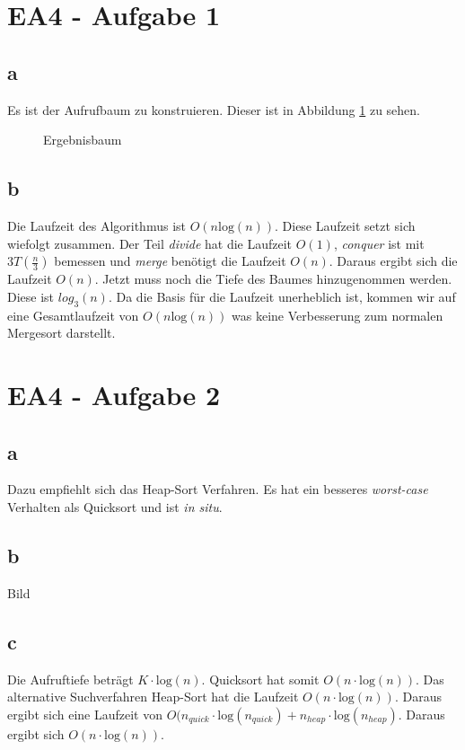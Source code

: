 \documentclass[12pt]{article}
\begin{document}
\section*{EA4 - Aufgabe 1}

\subsection*{a}
Es ist der Aufrufbaum zu konstruieren. Dieser ist in Abbildung \ref{img:abb1} zu sehen.
\begin{figure}[h]
	\centering
	\scalebox{.5}{}
	\caption{Ergebnisbaum}
	\label{img:abb1}
\end{figure}
\subsection*{b}
Die Laufzeit des Algorithmus ist $O(n \text{log}(n))$. Diese Laufzeit setzt sich wiefolgt zusammen. Der Teil
\textit{divide} hat die Laufzeit $O(1)$, \textit{conquer} ist mit $3T(\frac{n}{3})$ bemessen und \textit{merge}
benötigt die Laufzeit $O(n)$. Daraus ergibt sich die Laufzeit $O(n)$. Jetzt muss noch die Tiefe des Baumes
hinzugenommen werden. Diese ist $log_3 (n)$. Da die Basis für die Laufzeit unerheblich ist, kommen wir auf eine
Gesamtlaufzeit von $O(n\text{log}(n))$ was keine Verbesserung zum normalen Mergesort darstellt.

\section*{EA4 - Aufgabe 2}

\subsection*{a}
Dazu empfiehlt sich das Heap-Sort Verfahren. Es hat ein besseres \textit{worst-case} Verhalten als Quicksort und ist
\textit{in situ}.

\subsection*{b}
Bild

\subsection*{c}
Die Aufruftiefe beträgt $K \cdot \text{log}(n)$. Quicksort hat somit $O(n \cdot \text{log}(n))$. Das 
alternative Suchverfahren Heap-Sort hat die Laufzeit $O(n \cdot \text{log}(n))$. Daraus ergibt sich eine Laufzeit
von $O( n_{quick} \cdot \text{log}(n_{quick}) +  n_{heap} \cdot \text{log}(n_{heap})$. Daraus ergibt sich $O(n \cdot \text{log}(n))$.
\end{document}
